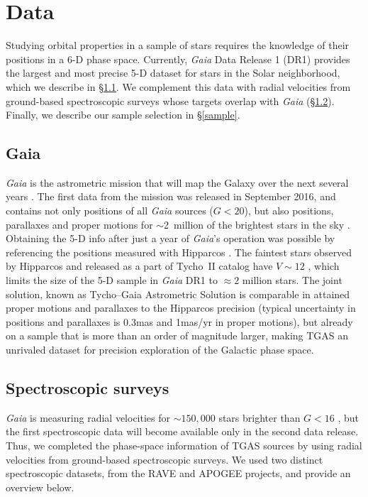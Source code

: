 \documentclass[apj, twocolappendix, numberedappendix, appendixfloats]{emulateapj}
\begin{document}
\section{Data}
\label{sec:data}
Studying orbital properties in a sample of stars requires the knowledge of their positions in a 6-D phase space.
Currently, \emph{Gaia} Data Release 1 (DR1) provides the largest and most precise 5-D dataset for stars in the Solar neighborhood, which we describe in \S\ref{gaia}.
We complement this data with radial velocities from ground-based spectroscopic surveys whose targets overlap with \emph{Gaia} (\S\ref{rvsurveys}).
Finally, we describe our sample selection in \S\ref{sample}.

\subsection{Gaia}
\label{gaia}
\emph{Gaia} is the astrometric mission that will map the Galaxy over the next several years \citep{perryman2001}.
The first data from the mission was released in September 2016, and contains not only positions of all \emph{Gaia} sources ($G<20$), but also positions, parallaxes and proper motions for $\sim$2~million of the brightest stars in the sky \citep{gaiadr1, gaiamission}.
Obtaining the 5-D info after just a year of \emph{Gaia}'s operation was possible by referencing the positions measured with Hipparcos \citep{michalik2015}.
The faintest stars observed by Hipparcos \citep{hipparcos, vleeuwen2007} and released as a part of Tycho~II catalog have $V\sim12$ \citep{hog2000}, which limits the size of the 5-D sample in \emph{Gaia} DR1 to $\approx2$ million stars.
The joint solution, known as Tycho--Gaia Astrometric Solution \citep[TGAS,][]{gaiaastrometry} is comparable in attained proper motions and parallaxes to the Hipparcos precision (typical uncertainty in positions and parallaxes is 0.3\;mas and 1\;mas/yr in proper motions), but already on a sample that is more than an order of magnitude larger, making TGAS an unrivaled dataset for precision exploration of the Galactic phase space.

\subsection{Spectroscopic surveys}
\label{rvsurveys}
\emph{Gaia} is measuring radial velocities for $\sim150,000$ stars brighter than $G<16$ \citep{gaiamission}, but the first spectroscopic data will become available only in the second data release.
Thus, we completed the phase-space information of TGAS sources by using radial velocities from ground-based spectroscopic surveys.
We used two distinct spectroscopic datasets, from the RAVE and APOGEE projects, and provide an overview below.
\end{document}
